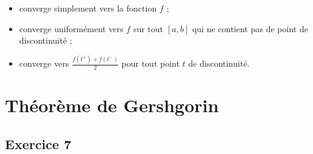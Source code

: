 \documentclass[a4paper,11pt]{article}
\theoremstyle{nonumberplain}
\theoremstyle{nonumberplain}
\theoremstyle{nonumberplain}
\begin{document}
    \begin{itemize}
        \item
        converge simplement vers la fonction $f$ ;

        \item
        converge uniformément vers $f$ sur tout $[a, b]$ qui ne contient pas de point de discontinuité ;

        \item
        converge vers $ \frac{f(t^{+}) + f(t^{-})}{2}$ pour tout point $t$ de discontinuité.
    \end{itemize}

\section{Théorème de Gershgorin}

\subsection*{Exercice 7}
\end{document}
